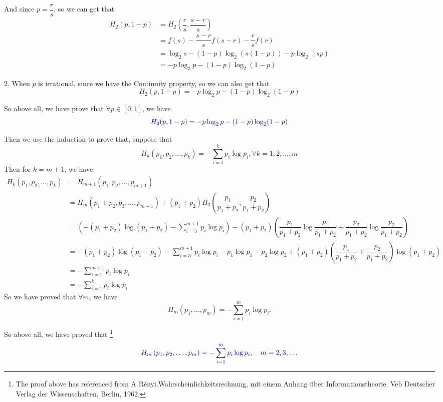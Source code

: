 And since $p=\dfrac{r}{s}$, so we can get that
\begin{align*}
H_2(p,1-p) &= H_2(\dfrac{r}{s},\dfrac{s-r}{s}) \\
&= f(s) -\dfrac{s-r}{s}f(s-r) - \dfrac{r}{s}f(r) \\
&= \log_2 s - (1-p)\log_2\left(s(1-p)\right) - p\log_2(sp) \\
&= -p\log_2p - (1-p)\log_2(1-p)
\end{align*}

2. When $p$ is irrational, since we have the Continuity property, so we can also get that
$$H_2(p,1-p) = -p\log_2p - (1-p)\log_2(1-p)$$

So above all, we have prove that $\forall p\in[0,1]$, we have
$$\textcolor{blue}{H_2(p,1-p) = -p\log_2p - (1-p)\log_2(1-p)}$$

Then we use the induction to prove that, suppose that
$$H_k(p_1, p_2, \ldots, p_k)=-\sum_{i=1}^k p_i \log p_i, \forall k=1,2,\ldots,m$$
Then for $k=m+1$, we have
\begin{align*}
H_k(p_1, p_2, \ldots, p_k) &= H_{m+1}(p_1, p_2, \ldots, p_{m+1}) \\
&= H_{m}(p_1+p_2, p_3, \ldots, p_{m+1}) + (p_1+p_2)H_2\left(\dfrac{p_1}{p_1+p_2}, \dfrac{p_2}{p_1+p_2}\right) \\
&= \left(-(p_1+p_2)\log(p_1+p_2)-\sum_{i=3}^{m+1}p_i\log p_i\right) - (p_1+p_2)\left(\dfrac{p_1}{p_1+p_2}\log\dfrac{p_1}{p_1+p_2} + \dfrac{p_2}{p_1+p_2}\log\dfrac{p_2}{p_1+p_2}\right) \\
&= -(p_1+p_2)\log(p_1+p_2)-\sum_{i=3}^{m+1}p_i\log p_i - p_1\log p_1 - p_2\log p_2 + (p_1+p_2)(\dfrac{p_1}{p_1+p_2}+\dfrac{p_2}{p_1+p_2})\log(p_1+p_2) \\
&= -\sum_{i=1}^{m+1}p_i\log p_i \\
&= -\sum_{i=1}^k p_i \log p_i
\end{align*}
So we have proved that $\forall m$, we have
$$H_m(p_1,\ldots,p_m)=-\sum_{i=1}^mp_i\log p_i.$$

So above all, we have proved that \footnote{The proof above has referenced from A Rényi.Wahrscheinlichkeitsrechnung, mit einem Anhang über Informationstheorie. Veb Deutscher Verlag der Wissenschaften, Berlin, 1962.}
$$\textcolor{blue}{H_m\left(p_1, p_2, \ldots, p_m\right)=-\sum_{i=1}^m p_i \log p_i, \quad m=2,3, \ldots}$$

\newpage